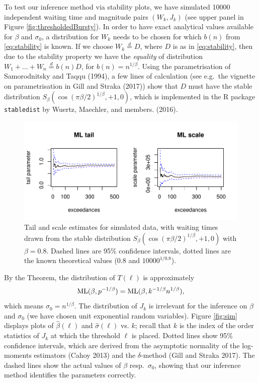 \documentclass[smallextended]{svjour3}       %
\begin{document}
To test our inference method via stability plots, we have simulated
10000 independent waiting time and magnitude pairs \((W_k, J_k)\) (see
upper panel in Figure \ref{fig:thresholdedBursty}). In order to have
exact analytical values available for \(\beta\) and \(\sigma_0\), a
distribution for \(W_k\) needs to be chosen for which \(b(n)\) from
\eqref{eq:stability} is known. If we choose \(W_k \stackrel{d}{=} D\),
where \(D\) is as in \eqref{eq:stability}, then due to the stability
property we have the \emph{equality} of distribution
\(W_1 + \ldots + W_n \stackrel{d}{=} b(n) D\), for
\(b(n) = n^{1/\beta}\). Using the parametrisation of Samorodnitsky and
Taqqu (1994), a few lines of calculation (see e.g.~the vignette on
parametrisation in Gill and Straka (2017)) show that \(D\) must have the
stable distribution \(S_\beta(\cos(\pi \beta/2)^{1/\beta}, +1, 0)\),
which is implemented in the R package \texttt{stabledist} by Wuertz,
Maechler, and members. (2016).

\begin{figure}[b]
\includegraphics[width=\textwidth]{article_springer_files/figure-latex/simulated-example-1} \caption{Tail and scale estimates for simulated data, with waiting times drawn from the stable distribution $S_\beta(\cos(\pi \beta/2)^{1/\beta}, +1, 0)$ with $\beta = 0.8$. Dashed lines are 95\% confidence intervals, dotted lines are the known theoretical values ($0.8$ and $10000^{1/0.8}$). \label{fig:sim}}\label{fig:simulated-example}
\end{figure}

By the Theorem, the distribution of \(T(\ell)\) is approximately \[
{\rm ML}(\beta, p^{-1/\beta}) 
= {\rm ML}(\beta, k^{-1/\beta} n^{1/\beta}),
\] which means \(\sigma_0 = n^{1/\beta}\). The distribution of \(J_k\)
is irrelevant for the inference on \(\beta\) and \(\sigma_0\) (we have
chosen unit exponential random variables). Figure \ref{fig:sim} displays
plots of \(\hat \beta(\ell)\) and \(\hat \sigma(\ell)\) vs. \(k\);
recall that \(k\) is the index of the order statistics of \(J_k\) at
which the threshold \(\ell\) is placed. Dotted lines show 95\%
confidence intervals, which are derived from the asymptotic normality of
the log-moments estimators (Cahoy 2013) and the \(\delta\)-method (Gill
and Straka 2017). The dashed lines show the actual values of \(\beta\)
resp.~\(\sigma_0\), showing that our inference method identifies the
parameters correctly.
\end{document}
